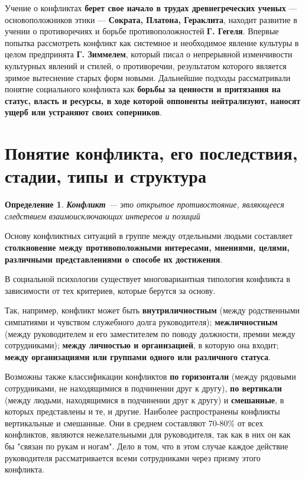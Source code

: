 \documentclass[a4paper,14pt]{extarticle}
\newtheorem{definition}{Определение}
\begin{document}
\hfill

Учение о конфликтах \textbf{берет свое начало в трудах древнегреческих ученых} — основоположников этики — \textbf{Сократа, Платона, Гераклита}, находит развитие в учении о противоречиях и борьбе противоположностей \textbf{Г. Гегеля}. Впервые попытка рассмотреть конфликт как системное и необходимое явление культуры в целом предпринята \textbf{Г. Зиммелем}, который писал о непрерывной изменчивости культурных явлений и стилей, о противоречии, результатом которого является зримое вытеснение старых форм новыми. Дальнейшие подходы рассматривали понятие социального конфликта как \textbf{борьбы за ценности и притязания на статус, власть и ресурсы, в ходе которой оппоненты нейтрализуют,
наносят ущерб или устраняют своих соперников}.

\pagebreak
\section{Понятие конфликта, его последствия, стадии, типы и структура}

\begin{definition}
\textbf{Конфликт} — это открытое противостояние, являющееся следствием взаимоисключающих интересов и позиций
\end{definition}

Основу конфликтных ситуаций в группе между отдельными людьми составляет \textbf{столкновение между противоположными интересами, мнениями, целями, различными представлениями о способе их достижения}.

В социальной психологии существует многовариантная типология конфликта в зависимости от тех критериев, которые берутся за основу.

\hfill

Так, например, конфликт может быть \textbf{внутриличностным} (между родственными симпатиями и чувством служебного долга руководителя); \textbf{межличностным} (между руководителем и его заместителем по поводу должности, премии между сотрудниками); \textbf{между личностью и организацией}, в которую она входит; \textbf{между организациями или группами одного или различного статуса}.

\hfill

Возможны также классификации конфликтов \textbf{по горизонтали} (между рядовыми сотрудниками, не находящимися в подчинении друг к другу), \textbf{по вертикали} (между людьми, находящимися в подчинении друг к другу) и \textbf{смешанные}, в которых представлены и те, и другие. Наиболее распространены конфликты вертикальные и смешанные. Они в среднем составляют 70-80\% от всех конфликтов, являются нежелательными для руководителя, так как в них он как бы "связан по рукам и ногам". Дело в том, что в этом случае каждое действие руководителя рассматривается всеми сотрудниками через призму этого конфликта.
\end{document}

